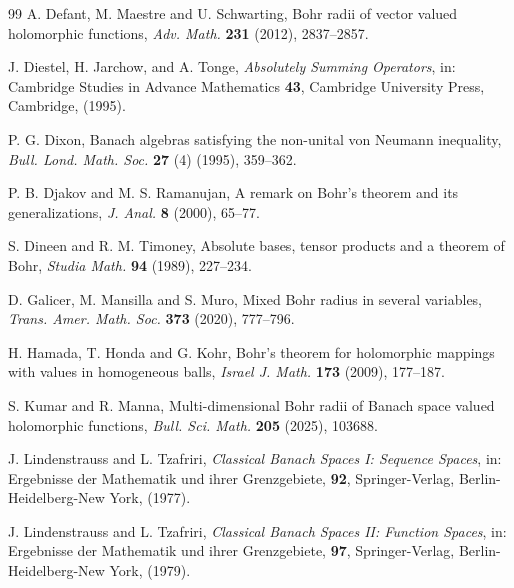 \documentclass[a4paper,12pt]{amsart}
\theoremstyle{definition}
\begin{document}
\begin{thebibliography}{99}
	 {\sc A. Defant,  M. Maestre} and {\sc U. Schwarting}, Bohr radii of vector valued holomorphic functions, {\it Adv. Math.} {\bf 231} (2012), 2837--2857.

 {\sc J. Diestel, H. Jarchow}, and {\sc A. Tonge}, {\it Absolutely Summing Operators}, in: Cambridge Studies in Advance Mathematics {\bf 43}, Cambridge University Press, Cambridge, (1995).
	
	
	 {\sc P. G. Dixon}, Banach algebras satisfying the non-unital von Neumann inequality, \textit{Bull. Lond. Math. Soc.} \textbf{27} (4) (1995), 359--362.
	
	 {\sc P. B. Djakov} and {\sc M. S. Ramanujan}, A remark on Bohr's theorem and its generalizations, \textit{J. Anal.} \textbf{8} (2000), 65--77.
	
	 {\sc S. Dineen} and {\sc R. M. Timoney}, Absolute bases, tensor products and a theorem of Bohr, \textit{Studia Math.} \textbf{94} (1989), 227--234.
	

	 {\sc D. Galicer, M. Mansilla} and {\sc S. Muro}, Mixed Bohr radius in several variables, {\it Trans. Amer. Math. Soc.} {\bf 373} (2020), 777--796.
	
	 {\sc H. Hamada, T. Honda} and {\sc G. Kohr}, Bohr's theorem for holomorphic mappings with values in homogeneous balls, {\it Israel J. Math.} {\bf 173} (2009), 177--187.

	
	 {\sc S. Kumar} and {\sc R. Manna}, Multi-dimensional Bohr radii of Banach space valued holomorphic functions, {\it Bull. Sci. Math.} {\bf 205} (2025), 103688.
	
    {\sc J. Lindenstrauss} and {\sc L. Tzafriri}, {\it Classical Banach Spaces I: Sequence Spaces}, in: Ergebnisse der Mathematik und ihrer Grenzgebiete, {\bf 92}, Springer-Verlag, Berlin-Heidelberg-New York, (1977).
   
     {\sc J. Lindenstrauss} and {\sc L. Tzafriri}, {\it Classical Banach Spaces II: Function Spaces}, in: Ergebnisse der Mathematik und ihrer Grenzgebiete, {\bf 97}, Springer-Verlag, Berlin-Heidelberg-New York, (1979).
	

\end{thebibliography}
\end{document}
